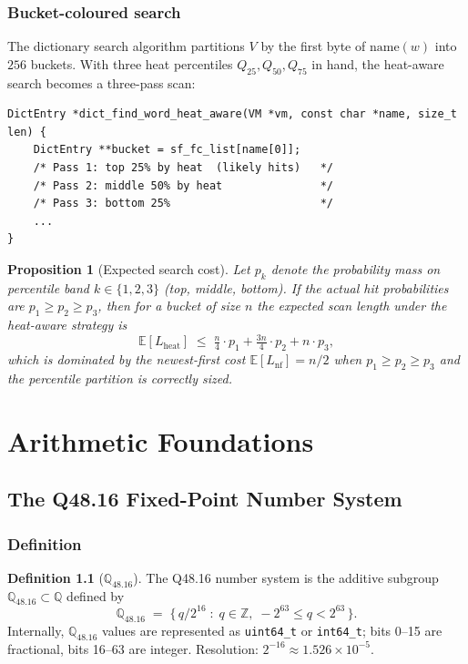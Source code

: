 \documentclass[11pt,letterpaper,openany]{book}
\theoremstyle{definition}
\newtheorem{definition}{Definition}[chapter]
\theoremstyle{plain}
\newtheorem{proposition}[definition]{Proposition}
\newcommand{\Qfp}{\mathbb{Q}_{48.16}}                %
\newcommand{\E}{\mathbb{E}}
\begin{document}
\section{Bucket-coloured search}

The dictionary search algorithm partitions $V$ by the first byte of
$\mathrm{name}(w)$ into $256$ buckets. With three heat percentiles
$Q_{25}, Q_{50}, Q_{75}$ in hand, the heat-aware search becomes a
three-pass scan:

\begin{lstlisting}[caption={Three-pass heat-aware lookup
  (\texttt{src/dictionary\_heat\_optimization.c}:129--174).},
  label={lst:heataware}]
DictEntry *dict_find_word_heat_aware(VM *vm, const char *name, size_t len) {
    DictEntry **bucket = sf_fc_list[name[0]];
    /* Pass 1: top 25% by heat  (likely hits)   */
    /* Pass 2: middle 50% by heat               */
    /* Pass 3: bottom 25%                       */
    ...
}
\end{lstlisting}

\begin{proposition}[Expected search cost]\label{prop:search-cost}
Let $p_k$ denote the probability mass on percentile band $k\in\{1,2,3\}$
(top, middle, bottom). If the actual hit probabilities are $p_1\ge p_2\ge p_3$,
then for a bucket of size $n$ the expected scan length under the heat-aware
strategy is
\[
  \E[L_{\mathrm{heat}}]
  \;\le\; \tfrac{n}{4} \cdot p_1 + \tfrac{3n}{4} \cdot p_2 + n \cdot p_3,
\]
which is dominated by the newest-first cost $\E[L_{\mathrm{nf}}] = n/2$
when $p_1 \ge p_2 \ge p_3$ and the percentile partition is correctly sized.
\end{proposition}

\part{Arithmetic Foundations}
\chapter{The Q48.16 Fixed-Point Number System}
\label{ch:q4816}

\section{Definition}

\begin{definition}[$\Qfp$]\label{def:q4816}
The Q48.16 number system is the additive subgroup
$\Qfp \subset \mathbb{Q}$ defined by
\[
  \Qfp \;=\; \{\, q / 2^{16} \;:\; q \in \mathbb{Z},\; -2^{63}\le q < 2^{63} \,\}.
\]
Internally, $\Qfp$ values are represented as
\texttt{uint64\_t} or \texttt{int64\_t}; bits 0--15 are fractional, bits
16--63 are integer. Resolution: $2^{-16} \approx 1.526\times 10^{-5}$.
\end{definition}
\end{document}
